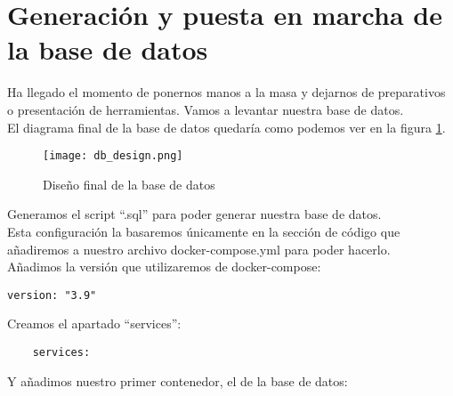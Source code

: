 \section{Generación y puesta en marcha de la base de datos}

Ha llegado el momento de ponernos manos a la masa y dejarnos de preparativos o presentación de herramientas. Vamos a levantar nuestra base de datos.
\\El diagrama final de la base de datos quedaría como podemos ver en la figura \ref{fig:db-design}.
\begin{figure}
    \texttt{[image: db\_design.png]}
    \caption{Diseño final de la base de datos}\label{fig:db-design}
\end{figure}
Generamos el script ``.sql'' para poder generar nuestra base de datos.
\\Esta configuración la basaremos únicamente en la sección de código que añadiremos a nuestro archivo docker-compose.yml para poder hacerlo.
\\Añadimos la versión que utilizaremos de docker-compose:

\begin{verbatim}
version: "3.9"
\end{verbatim}

Creamos el apartado ``services'':

\begin{verbatim}
    services:
\end{verbatim}

Y añadimos nuestro primer contenedor, el de la base de datos:

